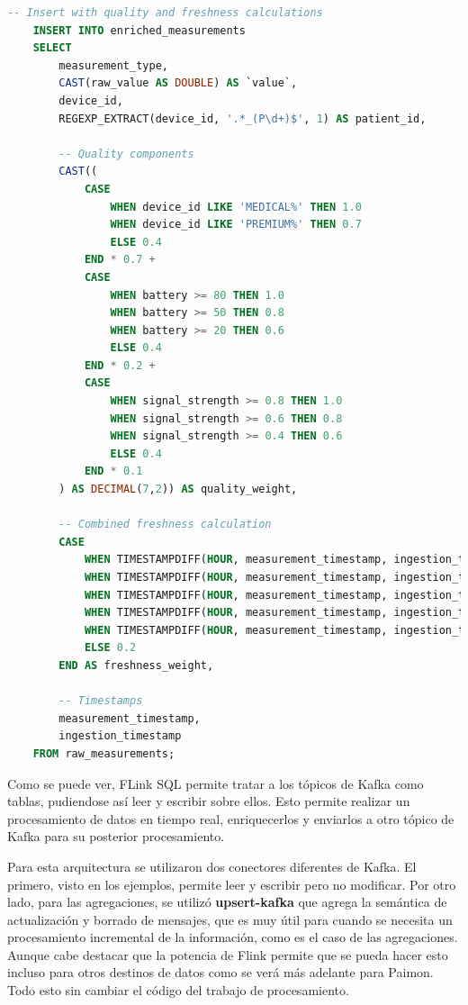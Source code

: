 \begin{lstlisting}[language=sql]
    -- Insert with quality and freshness calculations
    INSERT INTO enriched_measurements
    SELECT
        measurement_type,
        CAST(raw_value AS DOUBLE) AS `value`,
        device_id,
        REGEXP_EXTRACT(device_id, '.*_(P\d+)$', 1) AS patient_id,

        -- Quality components
        CAST((
            CASE
                WHEN device_id LIKE 'MEDICAL%' THEN 1.0
                WHEN device_id LIKE 'PREMIUM%' THEN 0.7
                ELSE 0.4
            END * 0.7 +
            CASE
                WHEN battery >= 80 THEN 1.0
                WHEN battery >= 50 THEN 0.8
                WHEN battery >= 20 THEN 0.6
                ELSE 0.4
            END * 0.2 +
            CASE
                WHEN signal_strength >= 0.8 THEN 1.0
                WHEN signal_strength >= 0.6 THEN 0.8
                WHEN signal_strength >= 0.4 THEN 0.6
                ELSE 0.4
            END * 0.1
        ) AS DECIMAL(7,2)) AS quality_weight,

        -- Combined freshness calculation
        CASE
            WHEN TIMESTAMPDIFF(HOUR, measurement_timestamp, ingestion_timestamp) <= 1 THEN 1.0
            WHEN TIMESTAMPDIFF(HOUR, measurement_timestamp, ingestion_timestamp) <= 6 THEN 0.9
            WHEN TIMESTAMPDIFF(HOUR, measurement_timestamp, ingestion_timestamp) <= 12 THEN 0.7
            WHEN TIMESTAMPDIFF(HOUR, measurement_timestamp, ingestion_timestamp) <= 24 THEN 0.5
            WHEN TIMESTAMPDIFF(HOUR, measurement_timestamp, ingestion_timestamp) <= 48 THEN 0.3
            ELSE 0.2
        END AS freshness_weight,
        
        -- Timestamps
        measurement_timestamp,
        ingestion_timestamp
    FROM raw_measurements;
\end{lstlisting}

Como se puede ver, FLink SQL permite tratar a los tópicos de Kafka como tablas, pudiendose así leer y escribir sobre ellos. 
Esto permite realizar un procesamiento de datos en tiempo real,
enriquecerlos y enviarlos a otro tópico de Kafka para su posterior procesamiento.\newline

Para esta arquitectura se utilizaron dos conectores diferentes de Kafka. El primero, visto en los ejemplos, permite leer y escribir pero no modificar. 
Por otro lado, para las agregaciones, se utilizó \textbf{upsert-kafka} que agrega la semántica de actualización y borrado de mensajes,
que es muy útil para cuando se necesita un procesamiento incremental de la información, como es el caso de las agregaciones. 
Aunque cabe destacar que la potencia de Flink permite que se pueda hacer esto incluso para otros destinos de datos como se verá más adelante para Paimon.
Todo esto sin cambiar el código del trabajo de procesamiento. 

